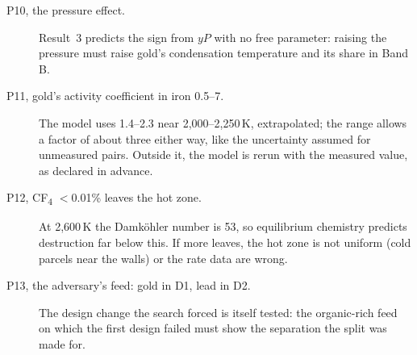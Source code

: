 \documentclass[11pt,a4paper]{article}
\begin{document}
\begin{description}
\item[P10, the pressure effect.] Result~3 predicts the sign from $yP$ with no free parameter: raising the pressure must raise gold's condensation temperature and its share in Band B.
\item[P11, gold's activity coefficient in iron 0.5--7.] The model uses 1.4--2.3 near 2,000--2,250\,K, extrapolated; the range allows a factor of about three either way, like the uncertainty assumed for unmeasured pairs. Outside it, the model is rerun with the measured value, as declared in advance.
\item[P12, CF\textsubscript{4} $<$0.01\% leaves the hot zone.] At 2,600\,K the Damk\"ohler number is 53, so equilibrium chemistry predicts destruction far below this. If more leaves, the hot zone is not uniform (cold parcels near the walls) or the rate data are wrong.
\item[P13, the adversary's feed: gold in D1, lead in D2.] The design change the search forced is itself tested: the organic-rich feed on which the first design failed must show the separation the split was made for.
\end{description}

\end{document}
